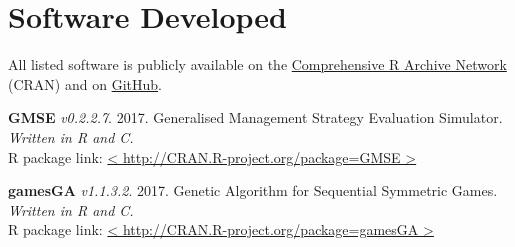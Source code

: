 \documentclass[letterpaper]{article}
\begin{document}
\section*{Software Developed}

All listed software is publicly available on the \href{https://cran.r-project.org/}{Comprehensive R Archive Network} (CRAN) and on \href{https://github.com/bradduthie}{GitHub}.

\begin{etaremune}
\item {\bf GMSE} {\it v0.2.2.7}. 2017. Generalised Management Strategy Evaluation Simulator. {\it Written in R and C.} \\
R package link: \href{http://CRAN.R-project.org/package=GMSE}{< http://CRAN.R-project.org/package=GMSE >}
\item {\bf gamesGA} {\it v1.1.3.2}. 2017. Genetic Algorithm for Sequential Symmetric Games. {\it Written in R and C.} \\
R package link: \href{http://CRAN.R-project.org/package=gamesGA}{< http://CRAN.R-project.org/package=gamesGA >}
\end{etaremune}
\end{document}
